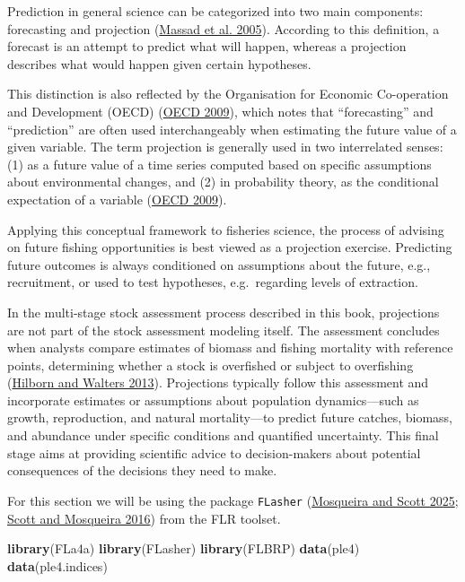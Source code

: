 \documentclass[
]{book}
\newenvironment{Shaded}{\begin{snugshade}}{\end{snugshade}}
\newcommand{\FunctionTok}[1]{\textcolor[rgb]{0.13,0.29,0.53}{\textbf{#1}}}
\newcommand{\NormalTok}[1]{#1}
\begin{document}
Prediction in general science can be categorized into two main components: forecasting and projection (\protect\hyperlink{ref-massad2005}{Massad et al. 2005}). According to this definition, a forecast is an attempt to predict what will happen, whereas a projection describes what would happen given certain hypotheses.

This distinction is also reflected by the Organisation for Economic Co-operation and Development (OECD) (\protect\hyperlink{ref-OECD}{OECD 2009}), which notes that ``forecasting'' and ``prediction'' are often used interchangeably when estimating the future value of a given variable. The term projection is generally used in two interrelated senses: (1) as a future value of a time series computed based on specific assumptions about environmental changes, and (2) in probability theory, as the conditional expectation of a variable (\protect\hyperlink{ref-OECD}{OECD 2009}).

Applying this conceptual framework to fisheries science, the process of advising on future fishing opportunities is best viewed as a projection exercise. Predicting future outcomes is always conditioned on assumptions about the future, e.g., recruitment, or used to test hypotheses, e.g.~regarding levels of extraction.

In the multi-stage stock assessment process described in this book, projections are not part of the stock assessment modeling itself. The assessment concludes when analysts compare estimates of biomass and fishing mortality with reference points, determining whether a stock is overfished or subject to overfishing (\protect\hyperlink{ref-hilborn2013quantitative}{Hilborn and Walters 2013}). Projections typically follow this assessment and incorporate estimates or assumptions about population dynamics---such as growth, reproduction, and natural mortality---to predict future catches, biomass, and abundance under specific conditions and quantified uncertainty. This final stage aims at providing scientific advice to decision-makers about potential consequences of the decisions they need to make.

For this section we will be using the package \texttt{FLasher} (\protect\hyperlink{ref-flasher}{Mosqueira and Scott 2025}; \protect\hyperlink{ref-flasher2016}{Scott and Mosqueira 2016}) from the FLR toolset.

\begin{Shaded}
\begin{Highlighting}[]
\FunctionTok{library}\NormalTok{(FLa4a)}
\FunctionTok{library}\NormalTok{(FLasher)}
\FunctionTok{library}\NormalTok{(FLBRP)}
\FunctionTok{data}\NormalTok{(ple4)}
\FunctionTok{data}\NormalTok{(ple4.indices)}
\end{Highlighting}
\end{Shaded}
\end{document}
